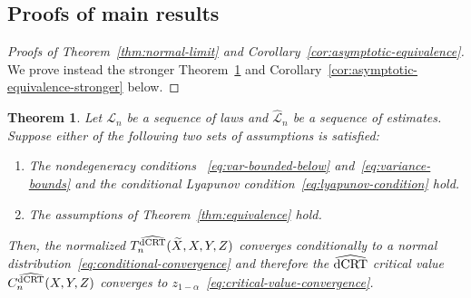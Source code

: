 \documentclass[aos]{imsart}
\theoremstyle{plain}
\newtheorem{theorem}{Theorem}
\theoremstyle{remark}
\newcommand{\srx}{X}									%
\newcommand{\srz}{Z}									%
\newcommand{\srxk}{\widetilde X}						%
\newcommand{\sry}{Y}									%
\newcommand{\law}{\mathcal L}							%
\newcommand{\lawhat}{\widehat{\mathcal L}}				%
\newcommand{\dCRThat}{\widehat{\textnormal{dCRT}}}		%
\begin{document}
\subsection{Proofs of main results}

\begin{proof}[Proofs of Theorem~\ref{thm:normal-limit} and Corollary~\ref{cor:asymptotic-equivalence}] 
We prove instead the stronger Theorem~\ref{thm:normal-limit-stronger} and Corollary~\ref{cor:asymptotic-equivalence-stronger} below.
\end{proof}

\begin{theorem} \label{thm:normal-limit-stronger}
	Let $\law_n$ be a sequence of laws and $\lawhat_n$ be a sequence of estimates. Suppose either of the following two sets of assumptions is satisfied: 
	\begin{enumerate}
		\item The nondegeneracy conditions ~\eqref{eq:var-bounded-below} and~\eqref{eq:variance-bounds} and the conditional Lyapunov condition~\eqref{eq:lyapunov-condition} hold.
		\item The assumptions of Theorem~\ref{thm:equivalence} hold.
	\end{enumerate}
	Then, the normalized $T_n^{\dCRThat}(\srxk, \srx, \sry, \srz)$ converges conditionally to a normal distribution~\eqref{eq:conditional-convergence} and therefore the $\dCRThat$ critical value $C^{\dCRThat}_n(\srx, \sry, \srz)$ converges to $z_{1-\alpha}$~\eqref{eq:critical-value-convergence}.
\end{theorem}
\end{document}
